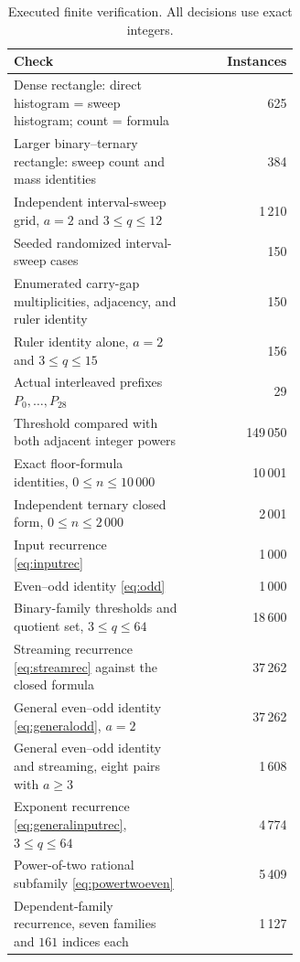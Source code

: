 \documentclass[11pt,letterpaper]{article}
\numberwithin{equation}{section}
\theoremstyle{definition}
\theoremstyle{remark}
\begin{document}
\begin{table}[htbp]
\centering
\caption{Executed finite verification. All decisions use exact integers.}
\label{tab:verification}
\begin{tabular}{>{\raggedright\arraybackslash}p{0.62\linewidth}r}
\toprule
Check&Instances\\
\midrule
Dense rectangle: direct histogram = sweep histogram; count = formula&625\\
Larger binary--ternary rectangle: sweep count and mass identities&384\\
Independent interval-sweep grid, $a=2$ and $3\le q\le12$&1\,210\\
Seeded randomized interval-sweep cases&150\\
Enumerated carry-gap multiplicities, adjacency, and ruler identity&150\\
Ruler identity alone, $a=2$ and $3\le q\le15$&156\\
Actual interleaved prefixes $P_0,\ldots,P_{28}$&29\\
Threshold compared with both adjacent integer powers&149\,050\\
Exact floor-formula identities, $0\le n\le10\,000$&10\,001\\
Independent ternary closed form, $0\le n\le2\,000$&2\,001\\
Input recurrence \eqref{eq:inputrec}&1\,000\\
Even--odd identity \eqref{eq:odd}&1\,000\\
Binary-family thresholds and quotient set, $3\le q\le64$&18\,600\\
Streaming recurrence \eqref{eq:streamrec} against the closed formula&37\,262\\
General even--odd identity \eqref{eq:generalodd}, $a=2$&37\,262\\
General even--odd identity and streaming, eight pairs with $a\ge3$&1\,608\\
Exponent recurrence \eqref{eq:generalinputrec}, $3\le q\le64$&4\,774\\
Power-of-two rational subfamily \eqref{eq:powertwoeven}&5\,409\\
Dependent-family recurrence, seven families and $161$ indices each&1\,127\\
\bottomrule
\end{tabular}
\end{table}
\end{document}

